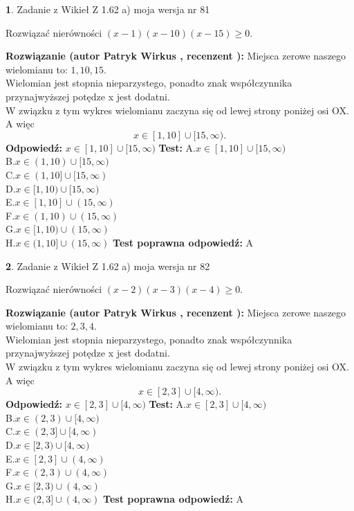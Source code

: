 \documentclass[12pt, a4paper]{article}
\theoremstyle{definition} %
\newtheorem{zad}{}
\newcommand{\zadStart}[1]{\begin{zad}#1\newline}
\newcommand{\zadStop}{\end{zad}}
\newcommand{\rozwStart}[2]{\noindent \textbf{Rozwiązanie (autor #1 , recenzent #2): }\newline}
\newcommand{\rozwStop}{\newline}
\newcommand{\odpStart}{\noindent \textbf{Odpowiedź:}\newline}
\newcommand{\odpStop}{\newline}
\newcommand{\testStart}{\noindent \textbf{Test:}\newline}
\newcommand{\testStop}{\newline}
\newcommand{\kluczStart}{\noindent \textbf{Test poprawna odpowiedź:}\newline}
\newcommand{\kluczStop}{\newline}
\begin{document}
\zadStart{Zadanie z Wikieł Z 1.62 a) moja wersja nr 81}

Rozwiązać nierówności $(x-1)(x-10)(x-15)\ge0$.
\zadStop
\rozwStart{Patryk Wirkus}{}
Miejsca zerowe naszego wielomianu to: $1, 10, 15$.\\
Wielomian jest stopnia nieparzystego, ponadto znak współczynnika przy\linebreak najwyższej potędze x jest dodatni.\\ W związku z tym wykres wielomianu zaczyna się od lewej strony poniżej osi OX. A więc $$x \in [1,10] \cup [15,\infty).$$
\rozwStop
\odpStart
$x \in [1,10] \cup [15,\infty)$
\odpStop
\testStart
A.$x \in [1,10] \cup [15,\infty)$\\
B.$x \in (1,10) \cup [15,\infty)$\\
C.$x \in (1,10] \cup [15,\infty)$\\
D.$x \in [1,10) \cup [15,\infty)$\\
E.$x \in [1,10] \cup (15,\infty)$\\
F.$x \in (1,10) \cup (15,\infty)$\\
G.$x \in [1,10) \cup (15,\infty)$\\
H.$x \in (1,10] \cup (15,\infty)$
\testStop
\kluczStart
A
\kluczStop



\zadStart{Zadanie z Wikieł Z 1.62 a) moja wersja nr 82}

Rozwiązać nierówności $(x-2)(x-3)(x-4)\ge0$.
\zadStop
\rozwStart{Patryk Wirkus}{}
Miejsca zerowe naszego wielomianu to: $2, 3, 4$.\\
Wielomian jest stopnia nieparzystego, ponadto znak współczynnika przy\linebreak najwyższej potędze x jest dodatni.\\ W związku z tym wykres wielomianu zaczyna się od lewej strony poniżej osi OX. A więc $$x \in [2,3] \cup [4,\infty).$$
\rozwStop
\odpStart
$x \in [2,3] \cup [4,\infty)$
\odpStop
\testStart
A.$x \in [2,3] \cup [4,\infty)$\\
B.$x \in (2,3) \cup [4,\infty)$\\
C.$x \in (2,3] \cup [4,\infty)$\\
D.$x \in [2,3) \cup [4,\infty)$\\
E.$x \in [2,3] \cup (4,\infty)$\\
F.$x \in (2,3) \cup (4,\infty)$\\
G.$x \in [2,3) \cup (4,\infty)$\\
H.$x \in (2,3] \cup (4,\infty)$
\testStop
\kluczStart
A
\kluczStop
\end{document}
